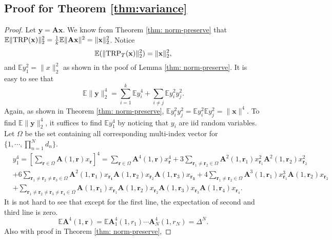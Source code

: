 \subsection*{Proof for Theorem \ref{thm:variance}}
\begin{proof}
Let $\mathbf{y}=\mathbf{Ax}$. We know from Theorem \ref{thm: norm-preserve} that $\mathbb{E}\|\textup{TRP}(\mathbf{x})\|^2_2 = \frac{1}{k}\mathbb{E}\|\mathbf{Ax}\|^2= \|\mathbf{x}\|^2_2$. 
Notice 
\[
\mathbb{E}(\|\textup{TRP}_T(\mathbf{x})\|^2_2) = \|\mathbf{x}\|^2_2, 
\]
and $\mathbb{E} y_1^2=\|x\|_2^2$ as shown in the poof of Lemma \ref{thm: norm-preserve}. It is easy to see that
\[
\mathbb{E}\|\mathbf{y}\|^4_2 = \sum_{i=1}^k \mathbb{E} y_i^4 + \sum_{i\neq j} \mathbb{E} y_i^2y_j^2.
\]
Again, as shown in Theorem \ref{thm: norm-preserve}, $\mathbb{E} y_i^2y_j^2 =\mathbb{E} y_i^2 \mathbb{E} y_j^2 = \|\mathbf{x}\|^4$. To find $\mathbb{E}\|\mathbf{y}\|^4_2$, it suffices to find $\mathbb{E} y_1^4$ by noticing that $y_i$ are iid random variables. Let $\Omega$ be the set containing all corresponding multi-index vector for $\{1,\cdots, \prod_{n=1}^N d_n\}$. 
\begin{equation}
\begin{aligned}
&y_1^4 = \left[\sum_{\mathbf{r}\in \Omega} \mathbf{A}(1,\mathbf{r}) x_{\mathbf{r}}\right]^4 = \sum_{\mathbf{r}\in \Omega} \mathbf{A}^4(1,\mathbf{r}) x^4_{\mathbf{r}} + 3\sum_{\mathbf{r}_1 \neq \mathbf{r}_2 \in \Omega} \mathbf{A}^2(1,\mathbf{r}_1) x^2_{\mathbf{r}_1}\mathbf{A}^2(1,\mathbf{r}_2) x^2_{\mathbf{r}_2}\\
&+6\sum_{\mathbf{r}_1 \neq \mathbf{r}_2 \neq \mathbf{r}_3 \in \Omega} \mathbf{A}^2(1,\mathbf{r}_1) x_\mathbf{\mathbf{r}_1} \mathbf{A}(1,\mathbf{r}_2)x_{\mathbf{r}_2}\mathbf{A}(1,\mathbf{r}_3)x_{\mathbf{r_3}}+4\sum_{\mathbf{r}_1 \neq \mathbf{r}_2 \in \Omega} \mathbf{A}^3(1,\mathbf{r}_1) x^3_{\mathbf{r}_1}\mathbf{A}(1,\mathbf{r}_2) x_{\mathbf{r}_2}\\
&+\sum_{\mathbf{r}_1 \neq \mathbf{r}_2 \neq \mathbf{r}_3\neq \mathbf{r}_4 \in \Omega} \mathbf{A}(1,\mathbf{r}_1) x_{\mathbf{r}_1}\mathbf{A}(1,\mathbf{r}_2) x_{\mathbf{r}_2}\mathbf{A}(1,\mathbf{r}_3) x_{\mathbf{r}_3}\mathbf{A}(1,\mathbf{r}_4) x_{\mathbf{r}_4}.\nonumber
\end{aligned}
\end{equation}
It is not hard to see that except for the first line, the expectation of second and third line is zero. 
\[
\mathbb{E} \mathbf{A}^4(1,\mathbf{r}) = \mathbb{E} \mathbf{A}^4_1 (1, r_1) \cdots \mathbf{A}^4_N(1, r_N) = \Delta^N. 
\]
Also with proof in Theorem \ref{thm: norm-preserve}, 

\end{proof}
